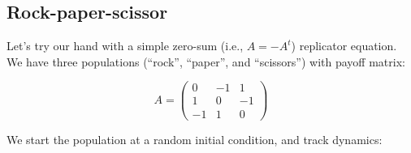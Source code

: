 \documentclass[]{book}
\begin{document}
\hypertarget{rock-paper-scissor}{%
\subsection{Rock-paper-scissor}\label{rock-paper-scissor}}

Let's try our hand with a simple zero-sum (i.e., \(A = -A^t\)) replicator equation. We have three populations (``rock'', ``paper'', and ``scissors'') with payoff matrix:

\[
A = \begin{pmatrix}
0 & -1 & 1\\
1 & 0 & -1\\
-1 & 1 & 0
\end{pmatrix}
\]

We start the population at a random initial condition, and track dynamics:
\end{document}
